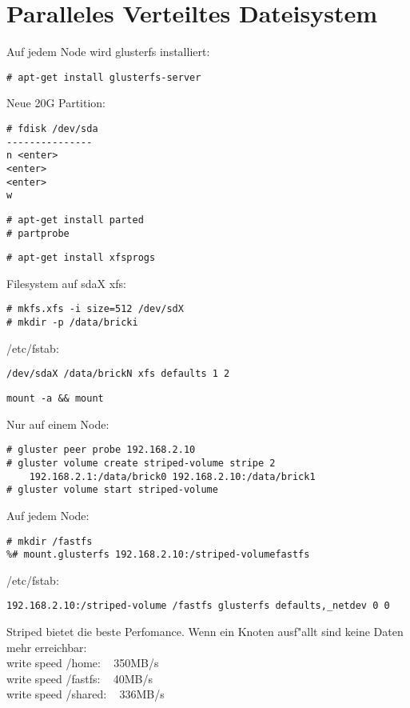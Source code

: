 \section{Paralleles Verteiltes Dateisystem}
Auf jedem Node wird glusterfs installiert:
\begin{lstlisting}[style=Bash]
# apt-get install glusterfs-server
\end{lstlisting}
Neue 20G Partition:
\begin{lstlisting}[style=Bash]
# fdisk /dev/sda
---------------
n <enter>
<enter>
<enter>
w
\end{lstlisting}
\begin{lstlisting}[style=Bash]
# apt-get install parted
# partprobe
\end{lstlisting}
\begin{lstlisting}[style=Bash]
# apt-get install xfsprogs
\end{lstlisting}
Filesystem auf sdaX xfs:
\begin{lstlisting}[style=Bash]
# mkfs.xfs -i size=512 /dev/sdX
# mkdir -p /data/bricki
\end{lstlisting}
/etc/fstab:
\begin{lstlisting}[style=Bash]
/dev/sdaX /data/brickN xfs defaults 1 2
\end{lstlisting}
\begin{lstlisting}[style=Bash]
mount -a && mount
\end{lstlisting}
Nur auf einem Node:
\begin{lstlisting}[style=Bash]
# gluster peer probe 192.168.2.10
# gluster volume create striped-volume stripe 2 
    192.168.2.1:/data/brick0 192.168.2.10:/data/brick1
# gluster volume start striped-volume
\end{lstlisting}
Auf jedem Node:
\begin{lstlisting}[style=Bash]
# mkdir /fastfs 
%# mount.glusterfs 192.168.2.10:/striped-volumefastfs
\end{lstlisting}
/etc/fstab:
\begin{lstlisting}[style=Bash]
192.168.2.10:/striped-volume /fastfs glusterfs defaults,_netdev 0 0
\end{lstlisting}
Striped bietet die beste Perfomance. Wenn ein Knoten ausf"allt sind keine Daten mehr erreichbar:\\
write speed /home: ~ 350MB/s\\
write speed /fastfs: ~ 40MB/s\\
write speed /shared: ~ 336MB/s\\
